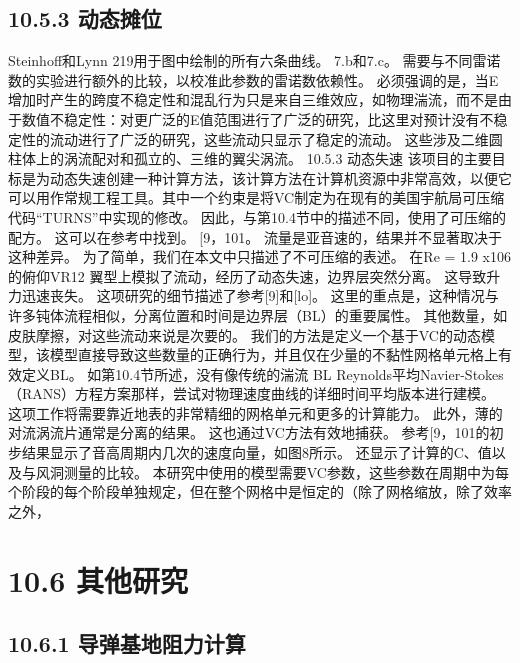 \documentclass[UTF8,11pt,a4paper,openany,fontset=fandol]{ctexbook}
\begin{document}
\subsection{10.5.3 动态摊位}
Steinhoff和Lynn 219用于图中绘制的所有六条曲线。 7.b和7.c。 需要与不同雷诺数的实验进行额外的比较，以校准此参数的雷诺数依赖性。 必须强调的是，当E增加时产生的跨度不稳定性和混乱行为只是来自三维效应，如物理湍流，而不是由于数值不稳定性：对更广泛的E值范围进行了广泛的研究，比这里对预计没有不稳定性的流动进行了广泛的研究，这些流动只显示了稳定的流动。 这些涉及二维圆柱体上的涡流配对和孤立的、三维的翼尖涡流。 10.5.3 动态失速 该项目的主要目标是为动态失速创建一种计算方法，该计算方法在计算机资源中非常高效，以便它可以用作常规工程工具。其中一个约束是将VC制定为在现有的美国宇航局可压缩代码“TURNS”中实现的修改。 因此，与第10.4节中的描述不同，使用了可压缩的配方。 这可以在参考中找到。 [9，101。 流量是亚音速的，结果并不显著取决于这种差异。 为了简单，我们在本文中只描述了不可压缩的表述。 在Re = 1.9 x106的俯仰VR12 翼型上模拟了流动，经历了动态失速，边界层突然分离。 这导致升力迅速丧失。 这项研究的细节描述了参考[9]和[lo]。 这里的重点是，这种情况与许多钝体流程相似，分离位置和时间是边界层（BL）的重要属性。 其他数量，如皮肤摩擦，对这些流动来说是次要的。 我们的方法是定义一个基于VC的动态模型，该模型直接导致这些数量的正确行为，并且仅在少量的不黏性网格单元格上有效定义BL。 如第10.4节所述，没有像传统的湍流 BL Reynolds平均Navier-Stokes（RANS）方程方案那样，尝试对物理速度曲线的详细时间平均版本进行建模。 这项工作将需要靠近地表的非常精细的网格单元和更多的计算能力。 此外，薄的对流涡流片通常是分离的结果。 这也通过VC方法有效地捕获。 参考[9，101的初步结果显示了音高周期内几次的速度向量，如图8所示。 还显示了计算的C、值以及与风洞测量的比较。 本研究中使用的模型需要VC参数，这些参数在周期中为每个阶段的每个阶段单独规定，但在整个网格中是恒定的（除了网格缩放，除了效率之外，

\section{10.6 其他研究}
\subsection{10.6.1 导弹基地阻力计算}
\end{document}
